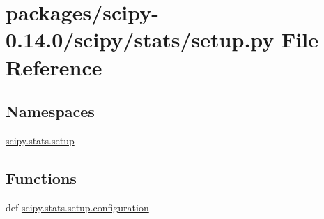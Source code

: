 \hypertarget{packages_2scipy-0_814_80_2scipy_2stats_2setup_8py}{}\section{packages/scipy-\/0.14.0/scipy/stats/setup.py File Reference}
\label{packages_2scipy-0_814_80_2scipy_2stats_2setup_8py}
\subsection*{Namespaces}
\begin{DoxyCompactItemize}
\item 
 \hyperlink{namespacescipy_1_1stats_1_1setup}{scipy.\+stats.\+setup}
\end{DoxyCompactItemize}
\subsection*{Functions}
\begin{DoxyCompactItemize}
\item 
def \hyperlink{namespacescipy_1_1stats_1_1setup_a50d4faec6ef4b7739ae9ba04989e54e7}{scipy.\+stats.\+setup.\+configuration}
\end{DoxyCompactItemize}
